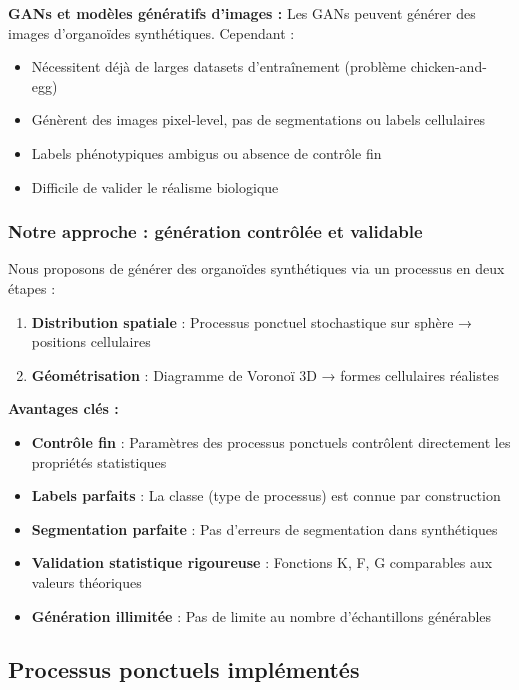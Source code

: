 \textbf{GANs et modèles génératifs d'images :}
Les GANs peuvent générer des images d'organoïdes synthétiques. Cependant :
\begin{itemize}
    \item Nécessitent déjà de larges datasets d'entraînement (problème chicken-and-egg)
    \item Génèrent des images pixel-level, pas de segmentations ou labels cellulaires
    \item Labels phénotypiques ambigus ou absence de contrôle fin
    \item Difficile de valider le réalisme biologique
\end{itemize}

\subsubsection{Notre approche : génération contrôlée et validable}

Nous proposons de générer des organoïdes synthétiques via un processus en deux étapes :
\begin{enumerate}
    \item \textbf{Distribution spatiale} : Processus ponctuel stochastique sur sphère → positions cellulaires
    \item \textbf{Géométrisation} : Diagramme de Voronoï 3D → formes cellulaires réalistes
\end{enumerate}

\textbf{Avantages clés :}
\begin{itemize}
    \item \textbf{Contrôle fin} : Paramètres des processus ponctuels contrôlent directement les propriétés statistiques
    \item \textbf{Labels parfaits} : La classe (type de processus) est connue par construction
    \item \textbf{Segmentation parfaite} : Pas d'erreurs de segmentation dans synthétiques
    \item \textbf{Validation statistique rigoureuse} : Fonctions K, F, G comparables aux valeurs théoriques
    \item \textbf{Génération illimitée} : Pas de limite au nombre d'échantillons générables
\end{itemize}

\subsection{Processus ponctuels implémentés}

